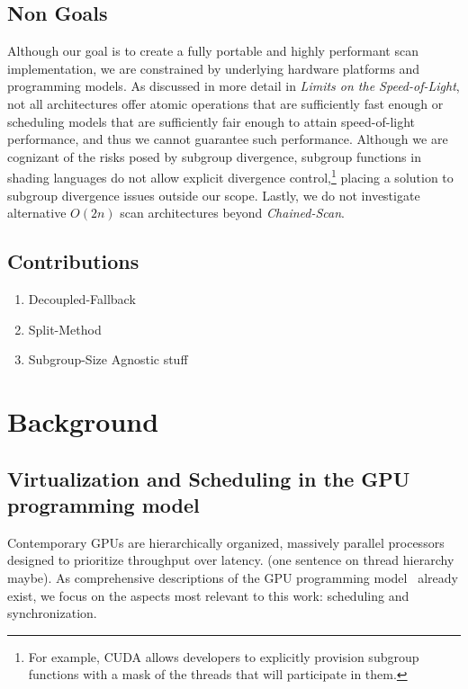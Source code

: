 \documentclass[sigconf]{acmart}
\begin{document}
\subsection{Non Goals}
Although our goal is to create a fully portable and highly performant scan implementation, we are constrained by underlying hardware platforms and programming models. As discussed in more detail in \emph{Limits on the Speed-of-Light}, not all architectures offer atomic operations that are sufficiently fast enough or scheduling models that are sufficiently fair enough to attain speed-of-light performance, and thus we cannot guarantee such performance. Although we are cognizant of the risks posed by subgroup divergence, subgroup functions in shading languages do not allow explicit divergence control,\footnote{For example, CUDA allows developers to explicitly provision subgroup functions with a mask of the threads that will participate in them.} placing a solution to subgroup divergence issues outside our scope. Lastly, we do not investigate alternative $O(2n)$ scan architectures beyond \emph{Chained-Scan}.

\subsection{Contributions}
\begin{enumerate}
    \item Decoupled-Fallback
    \item Split-Method
    \item Subgroup-Size Agnostic stuff
\end{enumerate}

\section{Background}
\subsection{Virtualization and Scheduling in the GPU programming model}
Contemporary GPUs are hierarchically organized, massively parallel processors designed to prioritize throughput over latency. (one sentence on thread hierarchy maybe). As comprehensive descriptions of the GPU programming model~\cite{} already exist, we focus on the aspects most relevant to this work: scheduling and synchronization. 
\end{document}
